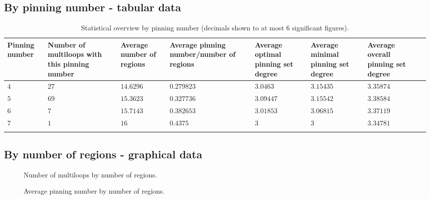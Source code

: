 \documentclass{article}%
\begin{document}
\subsection{By pinning number - tabular data}
\label{sec:byPinning}

\begin{table}[ht]
	\caption{Statistical overview by pinning number (decimals shown to at most $6$ significant figures).}
	\centering
	\renewcommand{\arraystretch}{1.5}
	\begin{tabularx}{\textwidth}{lXXXXXXX}
		\toprule
			Pinning number & Number of multiloops with this pinning number & Average number of regions & Average pinning number/number of regions & Average optimal pinning set degree & Average minimal pinning set degree & Average overall pinning set degree\\
			\hline
			$4$ & $27$ & $14.6296$ & $0.279823$ & $3.0463$ & $3.15435$ & $3.35874$ \\
			$5$ & $69$ & $15.3623$ & $0.327736$ & $3.09447$ & $3.15542$ & $3.38584$ \\
			$6$ & $7$ & $15.7143$ & $0.382653$ & $3.01853$ & $3.06815$ & $3.37119$ \\
			$7$ & $1$ & $16$ & $0.4375$ & $3$ & $3$ & $3.34781$ \\
		\bottomrule \\ 
	\end{tabularx}
\end{table}

\newpage

\subsection{By number of regions - graphical data}
\label{sec:byNumRegionsGraph}

\begin{multicols}{2}
\begin{figure}[H]
\centering
\scalebox{0.6}{}
\caption{Number of multiloops by number of regions.}
\label{fig:tex/img/numRegionsNumloops.pgf}
\end{figure}
\columnbreak

\begin{figure}[H]
\centering
\scalebox{0.6}{}
\caption{Average pinning number by number of regions.}
\label{fig:tex/img/numRegionsAvgPinNum.pgf}
\end{figure}
\end{multicols}
\end{document}
